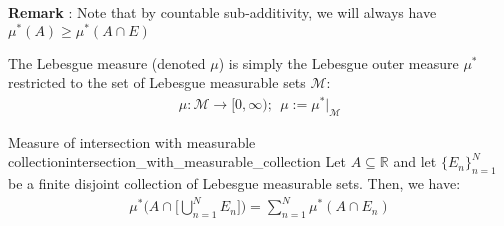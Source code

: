 \noindent \newline \textbf{Remark} : Note that by countable sub-additivity, we will always have $\mu^*(A) \ge \mu^*(A\cap E)$

\begin{definition}
    The Lebesgue measure (denoted $\mu$) is simply the Lebesgue outer measure $\mu^*$ restricted to the set of Lebesgue measurable sets $\mathcal{M}$:
    \begin{align*}
        \mu : \mathcal{M} \to [0, \infty); \ \ \mu := \mu^*\Big|_{\mathcal{M}}
    \end{align*}
\end{definition}

\begin{proposition}{Measure of intersection with measurable collection}{intersection_with_measurable_collection}
    Let $A\subseteq \mathbb{R}$ and let $\{E_n\}_{n=1}^N$ be a finite disjoint collection of Lebesgue measurable sets. Then, we have:
    \begin{align*}
        \mu^*\Bigg( A \cap \Bigg[ \bigcup_{n=1}^N E_n \Bigg] \Bigg) = \sum_{n=1}^N \mu^*(A\cap E_n)
    \end{align*}
\end{proposition}

